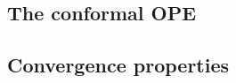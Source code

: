 \documentclass[a4paper,12pt]{article}
\numberwithin{equation}{section}
\newcounter{exercise}[section]
\begin{document}
%
%
%
%
%
%
%
%
%
%
%
%
%
%
%
%
%
%
%
%
%
%
%



\subsection{The conformal OPE}

%
%
%
%


\subsection{Convergence properties}

%
%
%
%
%
%
%
%
%
%
%


\end{document}
